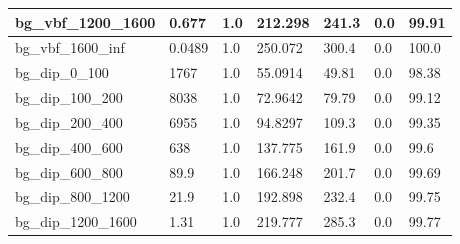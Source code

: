 \documentclass[a4paper, 10pt]{article}
\begin{document}
\begin{table}[H]
\begin{center}
\begin{tabular}{|m{23.0mm}|m{23.0mm}|m{18.0mm}|m{19.0mm}|m{19.0mm}|m{19.0mm}|m{19.0mm}|}
      \hline
      {\cellcolor{white}         bg\_vbf\_1200\_1600}& {\cellcolor{white}         0.677}& {\cellcolor{white}         1.0}& {\cellcolor{white}         212.298}& {\cellcolor{white}         241.3}& {\cellcolor{red}         0.0}& {\cellcolor{red}         99.91}\\
      \hline
      {\cellcolor{white}         bg\_vbf\_1600\_inf}& {\cellcolor{white}         0.0489}& {\cellcolor{white}         1.0}& {\cellcolor{white}         250.072}& {\cellcolor{white}         300.4}& {\cellcolor{red}         0.0}& {\cellcolor{red}         100.0}\\
      \hline
      {\cellcolor{white}         bg\_dip\_0\_100}& {\cellcolor{white}         1767}& {\cellcolor{white}         1.0}& {\cellcolor{white}         55.0914}& {\cellcolor{white}         49.81}& {\cellcolor{red}         0.0}& {\cellcolor{red}         98.38}\\
      \hline
      {\cellcolor{white}         bg\_dip\_100\_200}& {\cellcolor{white}         8038}& {\cellcolor{white}         1.0}& {\cellcolor{white}         72.9642}& {\cellcolor{white}         79.79}& {\cellcolor{red}         0.0}& {\cellcolor{red}         99.12}\\
      \hline
      {\cellcolor{white}         bg\_dip\_200\_400}& {\cellcolor{white}         6955}& {\cellcolor{white}         1.0}& {\cellcolor{white}         94.8297}& {\cellcolor{white}         109.3}& {\cellcolor{red}         0.0}& {\cellcolor{red}         99.35}\\
      \hline
      {\cellcolor{white}         bg\_dip\_400\_600}& {\cellcolor{white}         638}& {\cellcolor{white}         1.0}& {\cellcolor{white}         137.775}& {\cellcolor{white}         161.9}& {\cellcolor{red}         0.0}& {\cellcolor{red}         99.6}\\
      \hline
      {\cellcolor{white}         bg\_dip\_600\_800}& {\cellcolor{white}         89.9}& {\cellcolor{white}         1.0}& {\cellcolor{white}         166.248}& {\cellcolor{white}         201.7}& {\cellcolor{red}         0.0}& {\cellcolor{red}         99.69}\\
      \hline
      {\cellcolor{white}         bg\_dip\_800\_1200}& {\cellcolor{white}         21.9}& {\cellcolor{white}         1.0}& {\cellcolor{white}         192.898}& {\cellcolor{white}         232.4}& {\cellcolor{red}         0.0}& {\cellcolor{red}         99.75}\\
      \hline
      {\cellcolor{white}         bg\_dip\_1200\_1600}& {\cellcolor{white}         1.31}& {\cellcolor{white}         1.0}& {\cellcolor{white}         219.777}& {\cellcolor{white}         285.3}& {\cellcolor{red}         0.0}& {\cellcolor{red}         99.77}\\

\end{tabular}
\end{center}
\end{table}
\end{document}
